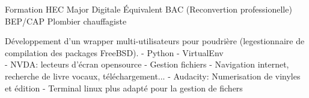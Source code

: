 \documentclass[
	a4paper,
]{FortySecondsCV/fortysecondscv}
\begin{document}
\newpage
\makebacksidebar

\begin{cvtable}[1.5]
		{Formation HEC Major Digitale}
		{Équivalent BAC (Reconvertion professionelle)}
		{BEP/CAP Plombier chauffagiste}
\end{cvtable}

\begin{cvtable}
	{
		Développement d’un wrapper multi-utilisateurs pour poudrière (legestionnaire de compilation des packages FreeBSD).
			\tabto{2mm}- Python
			\tabto{2mm}- VirtualEnv
			\\
	}
	{
		\tabto{2mm}- NVDA: lecteurs d'écran opensource
		\tabto{2mm}- Gestion fichiers
		\tabto{2mm}- Navigation internet, recherche de livre vocaux, téléchargement...
		\tabto{2mm}- Audacity: Numerisation de vinyles et édition
		\tabto{2mm}- Terminal linux plus adapté pour la gestion de fichers 
	}
\end{cvtable}

\cvsignature
\end{document}
